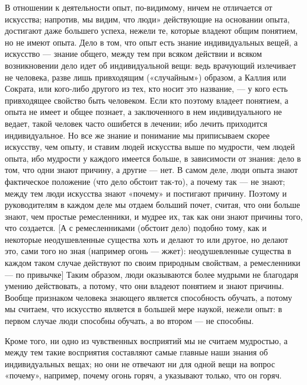 \documentclass{article}
\begin{document}
В отношении к деятельности опыт, по-видимому, ничем не отличается от искусства; напротив, мы видим, что люди» действующие на основании опыта, достигают даже большего успеха, нежели те, которые владеют общим понятием, но не имеют опыта. Дело в том, что опыт есть знание индивидуальных вещей, а искусство — знание общего, между тем при всяком действии и всяком возникновении дело идет об индивидуальной вещи: ведь врачующий излечивает не человека, разве лишь привходящим
\footnotemark[3]
(«случайным») образом, а Каллия или Сократа, или кого-либо другого из тех, кто носит это название, — у кого есть привходящее свойство быть человеком. Если кто поэтому владеет понятием, а опыта не имеет и общее познает, а заключенного в нем индивидуального не ведает, такой человек часто ошибется в лечении; ибо лечить приходится индивидуальное. Но все же знание и понимание мы приписываем скорее искусству, чем опыту, и ставим людей искусства
\footnotemark[4]
выше по мудрости, чем людей опыта, ибо мудрости у каждого имеется больше, в зависимости от знания: дело в том, что одни знают причину, а другие — нет. В самом деле, люди опыта знают фактическое положение
\footnotemark[5]
(что дело обстоит так-то), а почему так — не знают; между тем люди искусства знают «почему» и постигают причину. Поэтому и руководителям в каждом деле мы отдаем больший почет, считая, что они больше знают, чем простые ремесленники, и мудрее их, так как они знают причины того, что создается. [А с ремесленниками (обстоит дело) подобно тому, как и некоторые неодушевленные существа хоть и делают то или другое, но делают это, сами того но зная (например огонь — жжет): неодушевленные существа в каждом таком случае действуют по своим природным свойствам, а ремесленники — по привычке]
\footnotemark[6]
Таким образом, люди оказываются более мудрыми не благодаря умению действовать, а потому, что они владеют понятием и знают причины. Вообще признаком человека знающего является способность обучать, а потому мы считаем, что искусство является в большей мере наукой, нежели опыт: в первом случае люди способны обучать, а во втором — не способны.

Кроме того, ни одно из чувственных восприятий мы не считаем мудростью, а между тем такие восприятия составляют самые главные наши знания об индивидуальных вещах; но они не отвечают ни для одной вещи на вопрос «почему», например, почему огонь горяч, а указывают только, что он горяч.
\end{document}
